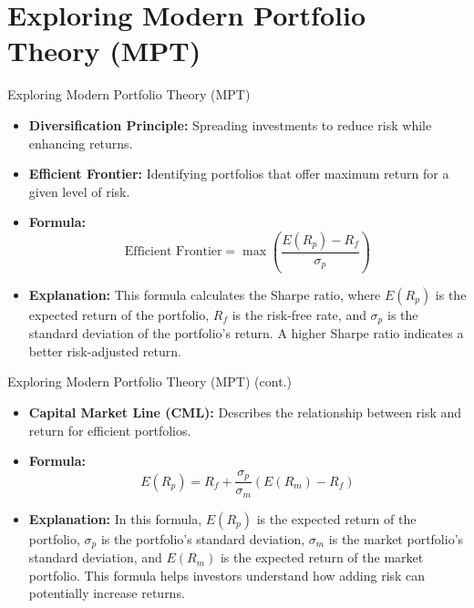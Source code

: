 \documentclass{beamer}
\begin{document}
\section{Exploring Modern Portfolio Theory (MPT)}
\begin{frame}{Exploring Modern Portfolio Theory (MPT)}
    \begin{itemize}
        \item \textbf{Diversification Principle:} Spreading investments to reduce risk while enhancing returns.
        \item \textbf{Efficient Frontier:} Identifying portfolios that offer maximum return for a given level of risk.
        \item \textbf{Formula:}
        \begin{equation*}
            \text{Efficient Frontier} = \max \left( \frac{E(R_p) - R_f}{\sigma_p} \right)
        \end{equation*}
        \item \textbf{Explanation:} This formula calculates the Sharpe ratio, where \( E(R_p) \) is the expected return of the portfolio, \( R_f \) is the risk-free rate, and \( \sigma_p \) is the standard deviation of the portfolio's return. A higher Sharpe ratio indicates a better risk-adjusted return.
    \end{itemize}
\end{frame}

\begin{frame}{Exploring Modern Portfolio Theory (MPT) (cont.)}
    \begin{itemize}
        \item \textbf{Capital Market Line (CML):} Describes the relationship between risk and return for efficient portfolios.
        \item \textbf{Formula:}
        \begin{equation*}
            E(R_p) = R_f + \frac{\sigma_p}{\sigma_m} \left( E(R_m) - R_f \right)
        \end{equation*}
        \item \textbf{Explanation:} In this formula, \( E(R_p) \) is the expected return of the portfolio, \( \sigma_p \) is the portfolio's standard deviation, \( \sigma_m \) is the market portfolio's standard deviation, and \( E(R_m) \) is the expected return of the market portfolio. This formula helps investors understand how adding risk can potentially increase returns.
    \end{itemize}
\end{frame}
\end{document}
